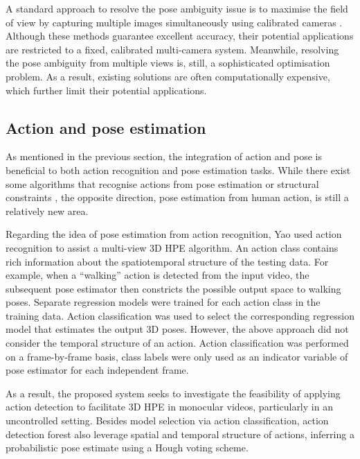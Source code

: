 A standard approach to resolve the pose ambiguity issue is to maximise the field of view by capturing multiple images simultaneously using calibrated cameras \cite{Pons-Moll2011, Sigal2012, Yao2012}.   
Although these methods guarantee excellent accuracy, their potential applications are restricted to a fixed, calibrated multi-camera system. 
Meanwhile, resolving the pose ambiguity from multiple views is, still, a sophisticated optimisation problem. 
As a result, existing solutions are often computationally expensive, which further limit their potential applications.   

\subsection{Action and pose estimation}

As mentioned in the previous section, the integration of action and pose is beneficial to both action recognition and pose estimation tasks. 
While there exist some algorithms that recognise actions from pose estimation or structural constraints \cite{Yu2010, Raja2011}, the opposite direction, \ie pose estimation from human action, is still a relatively new area. 

Regarding the idea of pose estimation from action recognition, Yao \etal \cite{Yao2012} used action recognition to assist a multi-view 3D HPE algorithm. 
An action class contains rich information about the spatiotemporal structure of the testing data. For example, when a ``walking'' action is detected from the input video, the subsequent pose estimator then constricts the possible output space to walking poses.   
Separate regression models were trained for each action class in the training data. 
Action classification was used to select the corresponding regression model that estimates the output 3D poses. 
However, the above approach did not consider the temporal structure of an action.    
Action classification was performed on a frame-by-frame basis, class labels were only used as an indicator variable of pose estimator for each independent frame. 

As a result, the proposed system seeks to investigate the feasibility of applying action detection to facilitate 3D HPE in monocular videos, particularly in an uncontrolled setting. 
Besides model selection via action classification, action detection forest also leverage spatial and temporal structure of actions, inferring a probabilistic pose estimate using a Hough voting scheme.  

